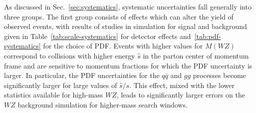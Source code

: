 As discussed in Sec.~\ref{sec:systematics}, systematic uncertainties fall generally into three groups.  The first group consists of effects which can alter the yield of observed events, with results of studies in simulation for signal and background given in Table~\ref{tab:scale-systematics} for detector effects and~\ref{tab:pdf-systematics} for the choice of PDF.  Events with higher values for $M(WZ)$ correspond to collisions with higher energy $\hat{s}$ in the parton center of momentum frame and are sensitive to momentum fractions for which the PDF uncertainty is larger.  In particular, the PDF uncertainties for the $q\bar{q}$ and $gg$ processes become significantly larger for large values of $\hat{s}/s$.  This effect, mixed with the lower statistics available for high-mass $WZ$, leads to significantly larger errors on the $WZ$ background simulation for higher-mass search windows.

